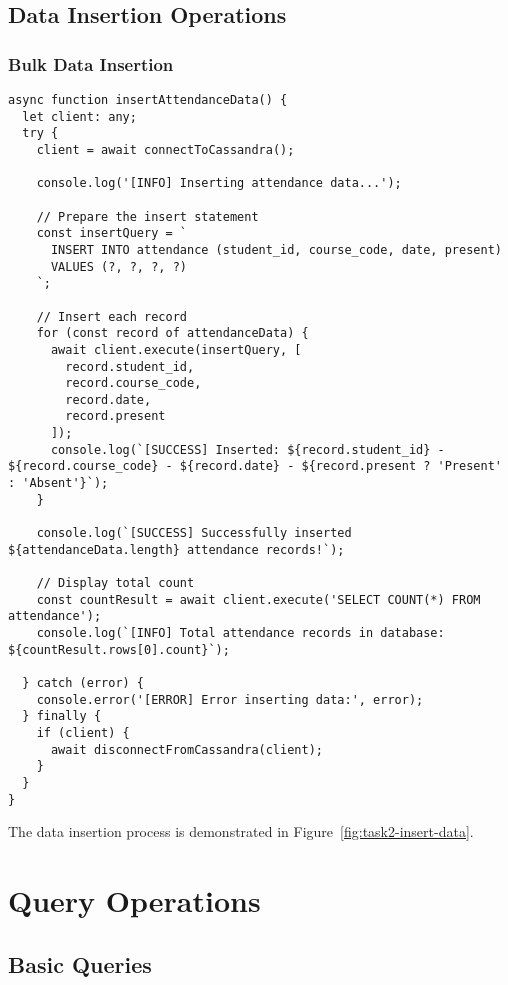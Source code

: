 \subsection{Data Insertion Operations}

\subsubsection{Bulk Data Insertion}
\begin{verbatim}
async function insertAttendanceData() {
  let client: any;
  try {
    client = await connectToCassandra();

    console.log('[INFO] Inserting attendance data...');

    // Prepare the insert statement
    const insertQuery = `
      INSERT INTO attendance (student_id, course_code, date, present)
      VALUES (?, ?, ?, ?)
    `;

    // Insert each record
    for (const record of attendanceData) {
      await client.execute(insertQuery, [
        record.student_id,
        record.course_code,
        record.date,
        record.present
      ]);
      console.log(`[SUCCESS] Inserted: ${record.student_id} - ${record.course_code} - ${record.date} - ${record.present ? 'Present' : 'Absent'}`);
    }

    console.log(`[SUCCESS] Successfully inserted ${attendanceData.length} attendance records!`);

    // Display total count
    const countResult = await client.execute('SELECT COUNT(*) FROM attendance');
    console.log(`[INFO] Total attendance records in database: ${countResult.rows[0].count}`);

  } catch (error) {
    console.error('[ERROR] Error inserting data:', error);
  } finally {
    if (client) {
      await disconnectFromCassandra(client);
    }
  }
}
\end{verbatim}

The data insertion process is demonstrated in Figure~\ref{fig:task2-insert-data}.

\section{Query Operations}

\subsection{Basic Queries}

